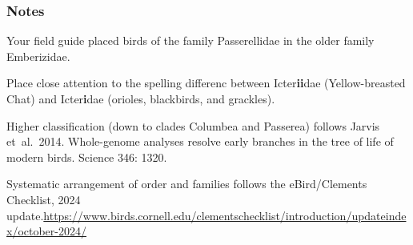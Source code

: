 \documentclass[10pt]{article}
\begin{document}
\subsubsection*{Notes}

Your field guide placed birds of the family Passerellidae in the older family Emberizidae.


\bigskip

Place close attention to the spelling differenc between Icter\textbf{ii}dae (Yellow-breasted Chat) and Icter\textbf{i}dae (orioles, blackbirds, and grackles).


\bigskip

Higher classification (down to clades Columbea and Passerea) follows Jarvis et~al.~2014. Whole-genome analyses resolve early branches in the tree of life of modern birds. Science 346: 1320.

\bigskip

Systematic arrangement of order and families follows the eBird/Clements Checklist, 2024 update.\newline \url{https://www.birds.cornell.edu/clementschecklist/introduction/updateindex/october-2024/}
\end{document}
